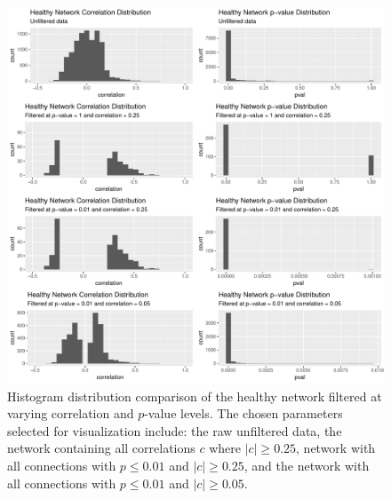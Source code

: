 \begin{figure}[!htb]
    \centering
    \includegraphics[width=1.0\linewidth]{figure/results/healthy_distributions_corr_pval_dist.pdf}
    \caption[Histogram distribution comparison of the healthy network filtered at varying correlation and $p$-value levels.]{Histogram distribution comparison of the healthy network filtered at varying correlation and $p$-value levels. The chosen parameters selected for visualization include: the raw unfiltered data, the network containing all correlations $c$ where $|c| \geq 0.25$, network with all connections with $p \leq 0.01$ and $|c| \geq 0.25$, and the network with all connections with $p \leq 0.01$ and $|c| \geq 0.05$.}
    \label{fig-res-h-dist}
\end{figure}

